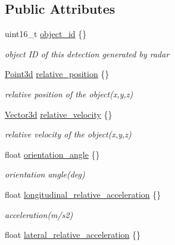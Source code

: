 \subsection*{Public Attributes}
\begin{DoxyCompactItemize}
\item 
uint16\+\_\+t \hyperlink{structmaf__perception__interface_1_1ContiRadarPerceptionObjectData_a15c89442af8a5becdad0a1db5418b522}{object\+\_\+id} \{\}
\begin{DoxyCompactList}\small\item\em object ID of this detection generated by radar \end{DoxyCompactList}\item 
\hyperlink{structmaf__perception__interface_1_1Point3d}{Point3d} \hyperlink{structmaf__perception__interface_1_1ContiRadarPerceptionObjectData_aec788f4a2ae7c6537dbe51ce269c56c5}{relative\+\_\+position} \{\}
\begin{DoxyCompactList}\small\item\em relative position of the object(x,y,z) \end{DoxyCompactList}\item 
\hyperlink{structmaf__perception__interface_1_1Vector3d}{Vector3d} \hyperlink{structmaf__perception__interface_1_1ContiRadarPerceptionObjectData_a26ab78f894b67455cc2aba3531a1b641}{relative\+\_\+velocity} \{\}
\begin{DoxyCompactList}\small\item\em relative velocity of the object(x,y,z) \end{DoxyCompactList}\item 
float \hyperlink{structmaf__perception__interface_1_1ContiRadarPerceptionObjectData_ad319233eb841c1196c52298b3fdd963d}{orientation\+\_\+angle} \{\}
\begin{DoxyCompactList}\small\item\em orientation angle(deg) \end{DoxyCompactList}\item 
float \hyperlink{structmaf__perception__interface_1_1ContiRadarPerceptionObjectData_a25c33afb7ebf1784faf087ac66a0cbf6}{longitudinal\+\_\+relative\+\_\+acceleration} \{\}
\begin{DoxyCompactList}\small\item\em acceleration(m/s2) \end{DoxyCompactList}\item 
float \hyperlink{structmaf__perception__interface_1_1ContiRadarPerceptionObjectData_abbba1879f83a8c7fce0b5bbb8b59f86c}{lateral\+\_\+relative\+\_\+acceleration} \{\}

\end{DoxyCompactItemize}
